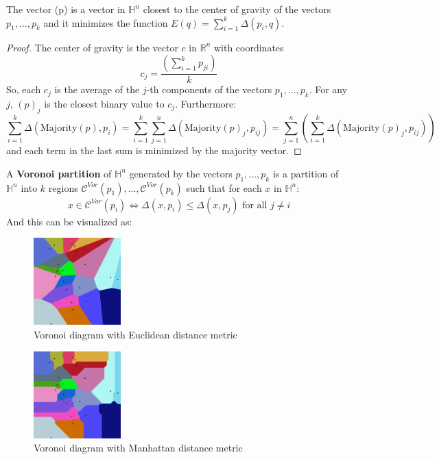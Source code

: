 \begin{lemma}
    The vector (p) is a vector in $\mathbb{H}^n$ closest to the center of gravity of the vectors $p_1, \dots, p_k$ and it minimizes the function $E(q) = \sum_{i=1}^k \Delta(p_i, q)$.
\end{lemma}
\begin{proof}
    The center of gravity is the vector $c$ in $\mathbb{R}^n$ with coordinates 
    \[
        c_j = \dfrac{\left(\sum\limits_{i=1}^{k} p_{ji}\right)}{k}
    \]
    So, each $c_j$ is the average of the $j$-th components of the vectors $p_1, \dots, p_k$.
    For any $j$, $(p)_j$ is the closest binary value to $c_j$. Furthermore:
    \[
        \sum_{i=1}^k \Delta(\text{Majority}(p), p_i) = \sum_{i=1}^k \sum_{j=1}^n \Delta(\text{Majority}(p)_j,p_{ij}) =   \sum_{j=1}^n \left(\sum_{i=1}^k \Delta(\text{Majority}(p)_j,p_{ij})\right)
    \]
    and each term in the last sum is minimized by the majority vector. 
\end{proof}

A \textbf{Voronoi partition} of $\mathbb{H}^n$ generated by the vectors $p_1, \dots, p_k$ is a partition of $\mathbb{H}^n$ into $k$ regions $\mathcal{C}^{Vor}(p_1), \dots, \mathcal{C}^{Vor}(p_k)$ such that for each $x$ in $\mathbb{H}^n$:
\[
    x \in \mathcal{C}^{Vor}(p_i) \iff \Delta(x, p_i) \leq \Delta(x, p_j) \text{ for all } j \neq i    
\]
\newpage
And this can be visualized as: 
    \begin{multicols}{2}
        \begin{center}
            \begin{figure}[H]
                \centering
                \includegraphics[width=0.3\textwidth]{./Images/Euclidean_Voronoi_diagram.png}
                \caption{Voronoi diagram with Euclidean distance metric}
            \end{figure}
        \end{center}
        \begin{center}
            \begin{figure}[H]
                \centering
                \includegraphics[width=0.3\textwidth]{./Images/Manhattan_Voronoi_Diagram.png}
                \caption{Voronoi diagram with Manhattan distance metric}
            \end{figure}
        \end{center}
    \end{multicols}

